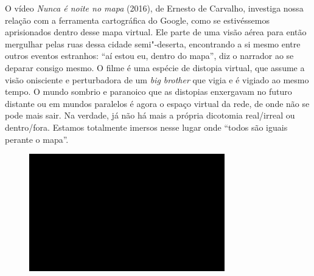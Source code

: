 O vídeo \emph{Nunca é noite no mapa} (2016), de Ernesto de Carvalho,
investiga nossa relação com a ferramenta cartográfica do Google, como se
estivéssemos aprisionados dentro desse mapa virtual. Ele parte de uma
visão aérea para então mergulhar pelas ruas dessa cidade semi"-deserta,
encontrando a si mesmo entre outros eventos estranhos: ``aí estou eu,
dentro do mapa'', diz o narrador ao se deparar consigo mesmo. O filme é
uma espécie de distopia virtual, que assume a visão onisciente e
perturbadora de um \emph{big brother} que vigia e é vigiado ao mesmo
tempo. O mundo sombrio e paranoico que as distopias enxergavam no futuro
distante ou em mundos paralelos é agora o espaço virtual da rede, de
onde não se pode mais sair. Na verdade, já não há mais a própria
dicotomia real/irreal ou dentro/fora. Estamos totalmente imersos nesse
lugar onde ``todos são iguais perante o mapa''.

\begin{figure}[!ht]

\centering
 \includegraphics[width=85mm]{./imgs/im1.jpg}
\caption{\tiny{}}

\end{figure}

